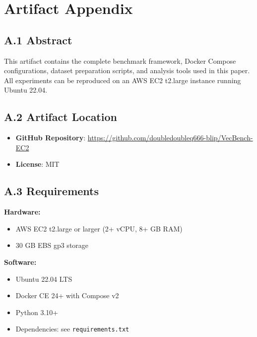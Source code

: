 \documentclass[12pt,a4paper]{article}
\begin{document}
\newpage
\appendix
\section*{Artifact Appendix}

\subsection*{A.1 Abstract}

This artifact contains the complete benchmark framework, Docker Compose configurations, dataset preparation scripts, and analysis tools used in this paper. All experiments can be reproduced on an AWS EC2 t2.large instance running Ubuntu 22.04.

\subsection*{A.2 Artifact Location}

\begin{itemize}[nosep]
    \item \textbf{GitHub Repository}: \url{https://github.com/doubledoubleq666-blip/VecBench-EC2}
    \item \textbf{License}: MIT
\end{itemize}

\subsection*{A.3 Requirements}

\textbf{Hardware:}
\begin{itemize}[nosep]
    \item AWS EC2 t2.large or larger (2+ vCPU, 8+ GB RAM)
    \item 30 GB EBS gp3 storage
\end{itemize}

\textbf{Software:}
\begin{itemize}[nosep]
    \item Ubuntu 22.04 LTS
    \item Docker CE 24+ with Compose v2
    \item Python 3.10+
    \item Dependencies: see \texttt{requirements.txt}
\end{itemize}
\end{document}
